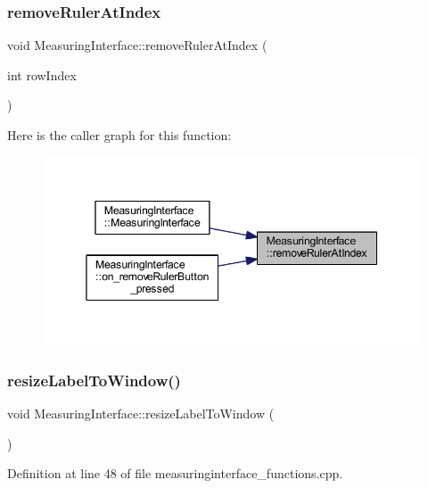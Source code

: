 \subsubsection{\texorpdfstring{removeRulerAtIndex}{removeRulerAtIndex}}
{\footnotesize\ttfamily void Measuring\+Interface\+::remove\+Ruler\+At\+Index (\begin{DoxyParamCaption}\item[{int}]{row\+Index }\end{DoxyParamCaption})\hspace{0.3cm}{\ttfamily [signal]}}

Here is the caller graph for this function\+:
\nopagebreak
\begin{figure}[H]
\begin{center}
\leavevmode
\includegraphics[width=345pt]{classMeasuringInterface_afe9e0efd285c9239d38d2fa9b9d8ff43_icgraph}
\end{center}
\end{figure}
\mbox{\label{classMeasuringInterface_a167a8fe58e371ea039490e90aa07c87d}} 
\subsubsection{\texorpdfstring{resizeLabelToWindow()}{resizeLabelToWindow()}}
{\footnotesize\ttfamily void Measuring\+Interface\+::resize\+Label\+To\+Window (\begin{DoxyParamCaption}{ }\end{DoxyParamCaption})\hspace{0.3cm}{\ttfamily [private]}}



Definition at line 48 of file measuringinterface\+\_\+functions.\+cpp.

